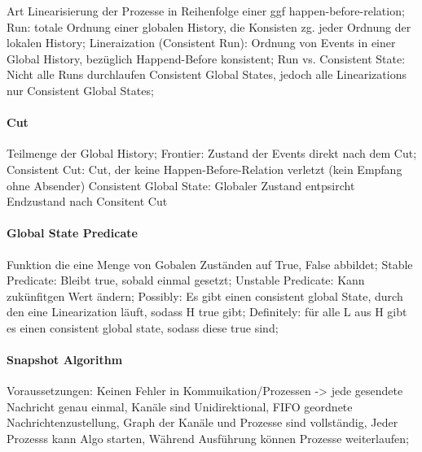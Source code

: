 \documentclass[pagesize,11pt,a4paper]{scrartcl}
\begin{document}
	Art Linearisierung der Prozesse in Reihenfolge einer ggf happen-before-relation;
	Run: totale Ordnung einer globalen History, die Konsisten zg. jeder Ordnung der lokalen History;
	Lineraization (Consistent Run): Ordnung von Events in einer Global History, bezüglich Happend-Before konsistent;
	Run vs. Consistent State: Nicht alle Runs durchlaufen Consistent Global States, jedoch alle Linearizations nur Consistent Global States;

\paragraph*{Cut}
	Teilmenge der Global History;
	Frontier: Zustand der Events direkt nach dem Cut;
	Consistent Cut: Cut, der keine Happen-Before-Relation verletzt (kein Empfang ohne Absender)
	Consistent Global State: Globaler Zustand entpsircht Endzustand nach Consitent Cut

\paragraph*{Global State Predicate}
	Funktion die eine Menge von Gobalen Zuständen auf True, False abbildet;
	Stable Predicate: Bleibt true, sobald einmal gesetzt;
	Unstable Predicate: Kann zukünfitgen Wert ändern;
	Possibly: Es gibt einen consistent global State, durch den eine Linearization läuft, sodass H true gibt;
	Definitely: für alle L aus H gibt es einen consistent global state, sodass diese true sind;
	
\paragraph*{Snapshot Algorithm}
	Voraussetzungen: Keinen Fehler in Kommuikation/Prozessen -> jede gesendete Nachricht genau einmal, Kanäle sind Unidirektional, FIFO geordnete Nachrichtenzustellung, Graph der Kanäle und Prozesse sind vollständig, Jeder Prozesss kann Algo starten, Während Ausführung können Prozesse weiterlaufen;
\end{document}
